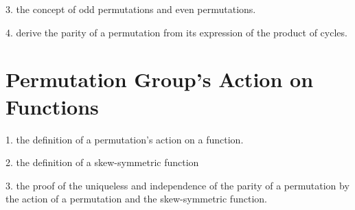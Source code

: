 \documentclass[onecolumn]{ctexart}
\begin{document}
3. the concept of odd permutations and even permutations.

4. derive the parity of a permutation from its expression of the product of 
cycles.

\section{Permutation Group's Action on Functions}

1. the definition of a permutation's action on a function.

2. the definition of a skew-symmetric function

3. the proof of the uniqueless and independence of the parity of a permutation 
by the action of a permutation and the skew-symmetric function.
\end{document}

